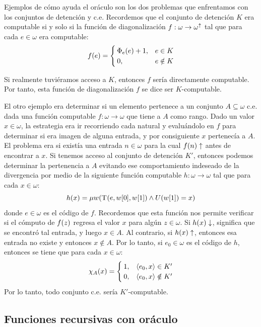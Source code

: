 Ejemplos de cómo ayuda el oráculo son los dos problemas que enfrentamos con los conjuntos de detención y c.e. Recordemos que el conjunto de detención $K$ era computable si y solo si la función de diagonalización $f:\omega\to\omega^{\uparrow}$ tal que para cada $e\in\omega$ era computable:
\[
	f\pa*{e} =
	\begin{cases}
		\Phi_{e}\pa*{e} + 1, & e\in K\\
		0, & e\notin K
	\end{cases}	
\]

Si realmente tuviéramos acceso a $K$, entonces $f$ sería directamente computable. Por tanto, esta función de diagonalización $f$ se dice ser $K$-computable. 

El otro ejemplo era determinar si un elemento pertenece a un conjunto $A\subseteq\omega$ c.e. dada una función computable $f:\omega\to\omega$ que tiene a $A$ como rango. Dado un valor $x\in\omega$, la estrategia era ir recorriendo cada natural y evaluándolo en $f$ para determinar si era imagen de alguna entrada, y por consiguiente $x$ pertenecía a $A$. El problema era si existía una entrada $n\in\omega$ para la cual $f\pa*{n}\DIVERGE$ antes de encontrar a $x$. Si tenemos acceso al conjunto de detención $K'$, entonces podemos determinar la pertenencia a $A$ evitando ese comportamiento indeseado de la divergencia por medio de la siguiente función computable $h:\omega\to\omega$ tal que para cada $x\in\omega$:
\[
	h\pa*{x} = \mu w\pa*{\KLEENE\pa*{e, w\bra*{0}, w\bra*{1}}\land U\pa*{w\bra*{1}} = x}
\]
donde $e\in\omega$ es el código de $f$. Recordemos que esta función nos permite verificar si el cómputo de $f\pa*{z}$ regresa el valor $x$ para algún $z\in\omega$. Si $h\pa*{x}\ACABA$, significa que se encontró tal entrada, y luego $x\in A$. Al contrario, si $h\pa*{x}\DIVERGE$, entonces esa entrada no existe y entonces $x\notin A$. Por lo tanto, si $e_{0}\in\omega$ es el código de $h$, entonces se tiene que para cada $x\in\omega$:
\[
	\CARACTERISTICA{A}\pa*{x} =
	\begin{cases}
		1, &\inner*{e_{0}, x}\in K'\\
		0, &\inner*{e_{0}, x}\notin K'
	\end{cases}
\]
Por lo tanto, todo conjunto c.e. sería $K'$-computable.

\begin{agregado}[subsección]
\subsection{Funciones recursivas con oráculo}
\end{agregado}

